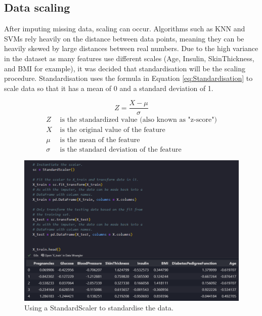 \documentclass[12pt]{report}
\begin{document}
\subsection{Data scaling}
After imputing missing data, scaling can occur. Algorithms such as KNN and SVMs rely heavily on the distance 
between data points, meaning they can be heavily skewed by large distances between real numbers. Due to the high 
variance in the dataset as many features use different scales (Age, Insulin, SkinThickness, and BMI for example), 
it was decided that standardisation will be the scaling procedure. Standardisation uses the formula in Equation \ref{eq:Standardisation}
to scale data so that it has a mean of 0 and a standard deviation of 1.

\begin{equation}\label{eq:Standardisation}
    Z = \frac{X - \mu}{\sigma}
\end{equation}
\begin{align*}
    Z & \text{ is the standardized value (also known as "z-score")} \\
    X & \text{ is the original value of the feature} \\
    \mu & \text{ is the mean of the feature} \\
    \sigma & \text{ is the standard deviation of the feature}
\end{align*}

\begin{figure}[H]
    \centering
    \includegraphics[width=\linewidth]{Preprocessing/Standardisation.png}
    \caption{Using a StandardScaler to standardise the data.}
    \label{fig:Standardisation}
\end{figure}
\end{document}
